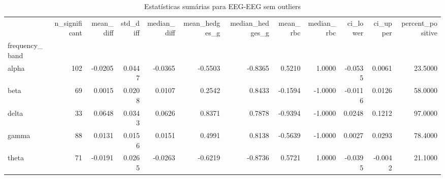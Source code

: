 \begin{table}[htbp]
\centering
\begin{tabular}{lrrrrrrrrrrr}
\toprule
 & n_significant & mean_diff & std_diff & median_diff & mean_hedges_g & median_hedges_g & mean_rbc & median_rbc & ci_lower & ci_upper & percent_positive \\
frequency_band &  &  &  &  &  &  &  &  &  &  &  \\
\midrule
alpha & 102 & -0.0205 & 0.0447 & -0.0365 & -0.5503 & -0.8365 & 0.5210 & 1.0000 & -0.0535 & 0.0061 & 23.5000 \\
beta & 69 & 0.0015 & 0.0208 & 0.0107 & 0.2542 & 0.8433 & -0.1594 & -1.0000 & -0.0116 & 0.0126 & 58.0000 \\
delta & 33 & 0.0648 & 0.0343 & 0.0626 & 0.8371 & 0.7878 & -0.9394 & -1.0000 & 0.0248 & 0.1212 & 97.0000 \\
gamma & 88 & 0.0131 & 0.0156 & 0.0151 & 0.4991 & 0.8138 & -0.5639 & -1.0000 & 0.0027 & 0.0293 & 78.4000 \\
theta & 71 & -0.0191 & 0.0265 & -0.0263 & -0.6219 & -0.8736 & 0.5721 & 1.0000 & -0.0395 & -0.0042 & 21.1000 \\
\bottomrule
\end{tabular}
\caption{Estatísticas sumárias para EEG-EEG sem outliers}
\label{tab:summary_eeg_eeg_without}
\end{table}
